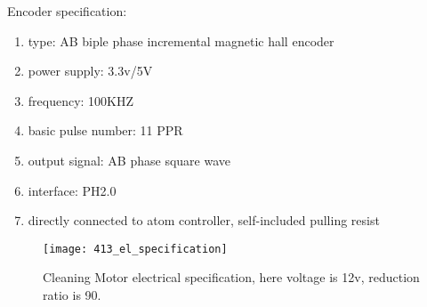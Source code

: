 Encoder specification:
\begin{enumerate}
	\item type: AB biple phase incremental magnetic hall encoder
	\item power supply: 3.3v/5V
	\item frequency: 100KHZ
	\item basic pulse number: 11 PPR
	\item output signal: AB phase square wave
	\item interface: PH2.0
	\item directly connected to atom controller, self-included pulling resist
\end{enumerate}
\begin{figure}[htb]
	\texttt{[image: 413\_el\_specification]}
	\caption[Cleaning Motor electrical specification]{ 
		Cleaning Motor electrical specification, here voltage is 12v, reduction ratio is 90.		 
		}
\end{figure}
